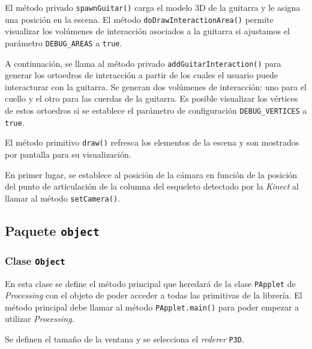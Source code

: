 \documentclass[10pt,a4paper]{report}
\begin{document}
	El método privado \texttt{spawnGuitar()} carga el modelo 3D de la guitarra y le asigna una posición en la escena. El método \texttt{doDrawInteractionArea()} permite visualizar los volúmenes de interacción asociados a la guitarra si ajustamos el parámetro \texttt{DEBUG\_AREAS} a \texttt{true}.
	
	A continuación, se llama al método privado \texttt{addGuitarInteraction()} para generar los ortoedros de interacción a partir de los cuales el usuario puede interacturar con la guitarra. Se generan dos volúmenes de interacción: uno para el cuello y el otro para las cuerdas de la guitarra. Es posible visualizar los vértices de estos ortoedros si se establece el parámetro de configuración \texttt{DEBUG\_VERTICES} a \texttt{true}.
	
	
	
	El método primitivo \texttt{draw()} refresca los elementos de la escena y son mostrados por pantalla para su visualización. 
	
		
	
	En primer lugar, se establece al posición de la cámara en función de la posición del punto de articulación de la columna del esqueleto detectado por la \textit{Kinect} al llamar al método \texttt{setCamera()}.
	
	
	
	\subsection{Paquete \texttt{object}}
	\subsubsection{Clase \texttt{Object}}\label{class:object}
	En esta clase se define el método principal que heredará de la clase \texttt{PApplet} de \textit{Processing} con el objeto de poder acceder a todas las primitivas de la librería. El método principal debe llamar al método \texttt{PApplet.main()} para poder empezar a utilizar \textit{Processing}.
	
	
	
	Se definen el tamaño de la ventana y se selecciona el \textit{rederer} \texttt{P3D}.
	
\end{document}
